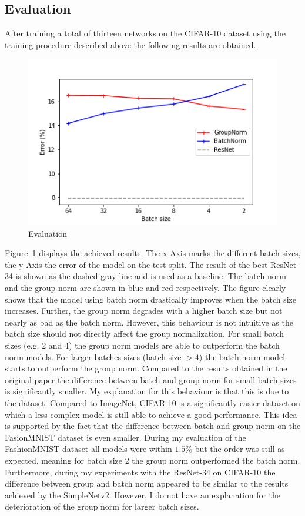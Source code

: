 \subsection{Evaluation}\label{subsec:evaluation}
After training a total of thirteen networks on the CIFAR-10 dataset using the training procedure described above the following results are obtained.
\begin{figure}[h]
    \centering
    \includegraphics[width=.85\textwidth]{res/plot.png}
    \caption{Evaluation}
    \label{fig:eval}
\end{figure}
Figure~\ref{fig:eval} displays the achieved results.
The x-Axis marks the different batch sizes, the y-Axis the error of the model on the test split.
The result of the best ResNet-34 is shown as the dashed gray line and is used as a baseline.
The batch norm and the group norm are shown in blue and red respectively.
The figure clearly shows that the model using batch norm drastically improves when the batch size increases.
Further, the group norm degrades with a higher batch size but not nearly as bad as the batch norm.
However, this behaviour is not intuitive as the batch size should not directly affect the group normalization.
For small batch sizes (e.g. 2 and 4) the group norm models are able to outperform the batch norm models.
For larger batches sizes (batch size $> 4$) the batch norm model starts to outperform the group norm.
Compared to the results obtained in the original paper the difference between batch and group norm for small batch sizes is significantly smaller.
My explanation for this behaviour is that this is due to the dataset.
Compared to ImageNet, CIFAR-10 is a significantly easier dataset on which a less complex model is still able to achieve a good performance.
This idea is supported by the fact that the difference between batch and group norm on the FasionMNIST dataset is even smaller.
During my evaluation of the FashionMNIST dataset all models were within $1.5\%$ but the order was still as expected, meaning for batch size 2 the group norm outperformed the batch norm.
Furthermore, during my experiments with the ResNet-34 on CIFAR-10 the difference between group and batch norm appeared to be similar to the results achieved by the SimpleNetv2.
However, I do not have an explanation for the deterioration of the group norm for larger batch sizes.
